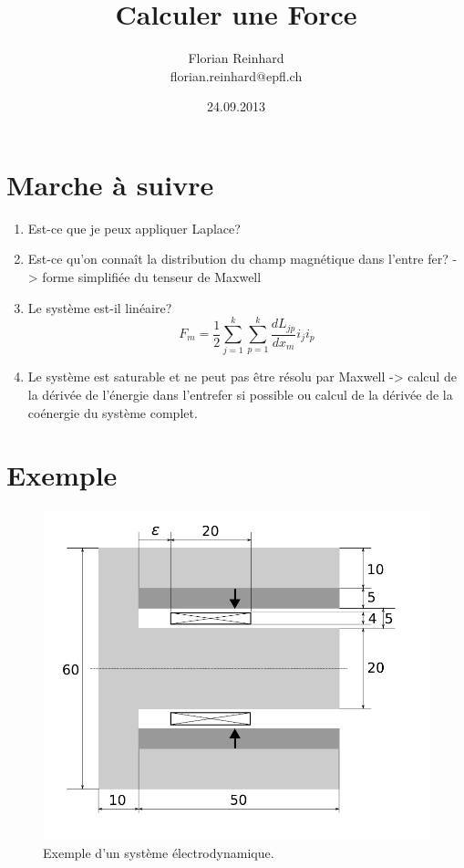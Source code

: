 \documentclass[a4paper,12pt,notitlepage]{article}
\title{Calculer une Force}
\date{24.09.2013}
\author{
    Florian Reinhard\\
    florian.reinhard@epfl.ch
}
\begin{document}
    \maketitle

    \section{Marche à suivre}
    \begin{enumerate}
        \item Est-ce que je peux appliquer Laplace?
        \item Est-ce qu'on connaît la distribution du champ magnétique dans
            l'entre fer? -> forme simplifiée du tenseur de Maxwell
        \item Le système est-il linéaire?
            \begin{equation}
                F_m = \frac{1}{2}\sum^k_{j=1} \sum^k_{p=1}\frac{dL_{jp}}{dx_m}i_j i_p
            \end{equation}
        \item Le système est saturable et ne peut pas être résolu par Maxwell
            -> calcul de la dérivée de l'énergie dans l'entrefer si possible ou
            calcul de la dérivée de la coénergie du système complet.
    \end{enumerate}


    \section{Exemple}
    \begin{figure}[H]
        \centering
        \includegraphics[width=12cm]{exemple_systeme_electrodynamique.png}
        \caption{Exemple d'un système électrodynamique.}
    \end{figure}
\end{document}
